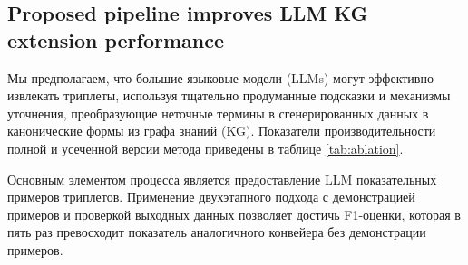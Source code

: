 \subsection{Proposed pipeline improves LLM KG extension performance}

\begin{table}[t]
\vskip -0.1in
\caption{
Предложенная двухшаговая методика демонстрирует превосходство над моделью SynthIE при оценке на наборе данных на естественном языке, основанной на человеческой экспертизе. Несмотря на то, что она уступает специально настроенной версии SynthIE для набора данных SynthIE-text-small, оптимизированной для его специфики, низкое значение метрики пересечения объединений (IoU) свидетельствует о том, что оба метода генерируют существенно различные результаты. Результаты, обозначенные ($^*$), относятся к модели, обученной исключительно на этом наборе данных.}
\vskip -0.16in
\label{tab:comparison}
\centering
{}
\vskip -0.2in
\end{table}


Мы предполагаем, что большие языковые модели (LLMs) могут эффективно извлекать триплеты, используя тщательно продуманные подсказки и механизмы уточнения, преобразующие неточные термины в сгенерированных данных в канонические формы из графа знаний (KG). Показатели производительности полной и усеченной версии метода приведены в таблице \ref{tab:ablation}.

Основным элементом процесса является предоставление LLM показательных примеров триплетов. Применение двухэтапного подхода с демонстрацией примеров и проверкой выходных данных позволяет достичь F1-оценки, которая в пять раз превосходит показатель аналогичного конвейера без демонстрации примеров.

